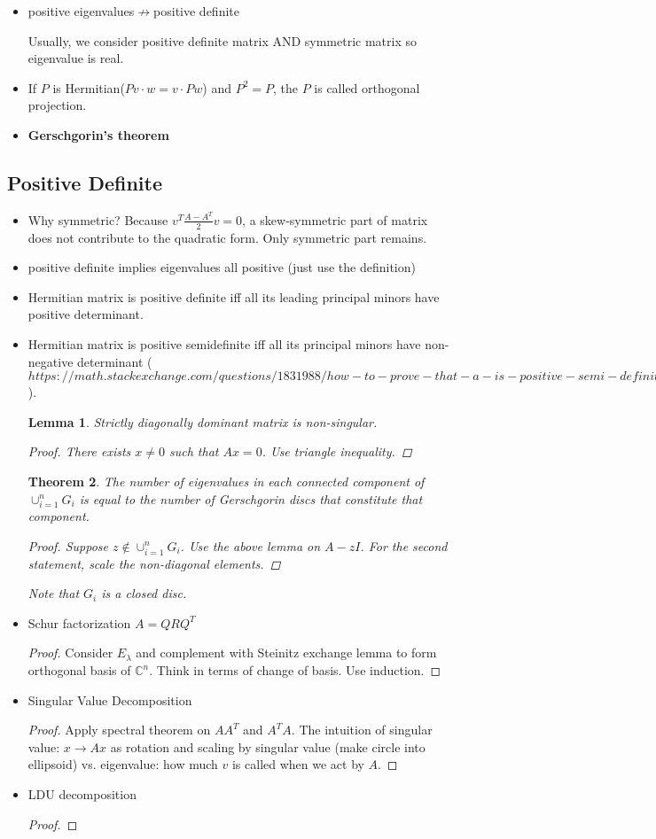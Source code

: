 \documentclass{article}
\newtheorem{theorem}{Theorem}
\newtheorem{lemma}[theorem]{Lemma}
\theoremstyle{remark}
\begin{document}
\begin{itemize}
\item positive eigenvalues$\not\to$positive definite

Usually, we consider positive definite matrix AND symmetric matrix so eigenvalue is real.
\item If $P$ is Hermitian($Pv\cdot w=v\cdot Pw$) and $P^2=P$, the $P$ is called orthogonal projection.
\item \textbf{Gerschgorin's theorem}
\end{itemize}
\subsection*{Positive Definite}
\begin{itemize}
\item Why symmetric? Because $v^T \frac{A-A^T}2 v=0$, a skew-symmetric part of matrix does not contribute to the quadratic form. Only symmetric part remains.
\item positive definite implies eigenvalues all positive (just use the definition)
    \item Hermitian matrix is positive definite iff all its leading principal minors have positive determinant.
    \item Hermitian matrix is positive semidefinite iff all its principal minors have non-negative determinant ($https://math.stackexchange.com/questions/1831988/how-to-prove-that-a-is-positive-semi-definite-if-all-principal-minors-are-non$).
\begin{lemma}
Strictly diagonally dominant matrix is non-singular.
\begin{proof}
There exists $x\neq 0$ such that $Ax=0$. Use triangle inequality.
\end{proof}
\end{lemma}
\begin{theorem}
The number of eigenvalues in each connected component of $\cup_{i=1}^n G_i$ is equal to the number of Gerschgorin discs that constitute that component.
\begin{proof}
Suppose $z\not\in \cup^n_{i=1}G_i$. Use the above lemma on $A-zI$. For the second statement, scale the non-diagonal elements.
\end{proof}
Note that $G_i$ is a closed disc.
\end{theorem}

\item Schur factorization
$A=QRQ^T$
\begin{proof}
Consider $E_\lambda$ and complement with Steinitz exchange lemma to form orthogonal basis of $\mathbb{C}^n$. Think in terms of change of basis. Use induction.
\end{proof}
\item Singular Value Decomposition
\begin{proof}
Apply spectral theorem on $AA^T$ and $A^TA$. The intuition of singular value: $x\to Ax$ as rotation and scaling by singular value (make circle into ellipsoid) vs. eigenvalue: how much $v$ is called when we act by $A$.
\end{proof}
\item LDU decomposition
\begin{proof}


\end{proof}
\end{itemize}
\end{document}
